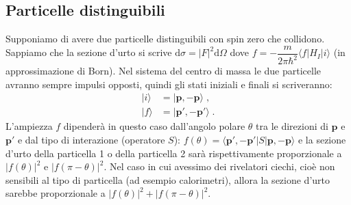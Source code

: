 \documentclass[10pt,a4paper]{report}
\theoremstyle{definition}
\numberwithin{equation}{section}
\newcommand{\diff}[1][]{\mathrm{d}#1}
\newcommand{\bra}{\langle}
\newcommand{\ket}{\rangle}
\begin{document}
\subsection{Particelle distinguibili}
Supponiamo di avere due particelle distinguibili con spin zero che collidono. Sappiamo che la sezione d'urto si scrive $\diff{\sigma}=|F|^2\diff{\Omega}$ dove $f=-\dfrac{m}{2\pi\hbar^2}\bra f|H_I|i\ket$ (in approssimazione di Born). Nel sistema del centro di massa le due particelle avranno sempre impulsi opposti, quindi gli stati iniziali e finali si scriveranno:
\begin{align*}
|i\ket&=|\mathbf{p},-\mathbf{p}\ket\;, \\
|f\ket&=|\mathbf{p}',-\mathbf{p}'\ket\;.
\end{align*}
L'ampiezza $f$ dipenderà in questo caso dall'angolo polare $\theta$ tra le direzioni di $\mathbf{p}$ e $\mathbf{p}'$ e dal tipo di interazione (operatore $S$): $f(\theta)=\bra \mathbf{p}',-\mathbf{p}'|S|\mathbf{p},-\mathbf{p}\ket$ e la sezione d'urto della particella 1 o della particella 2 sarà rispettivamente proporzionale a $|f(\theta)|^2$ e $|f(\pi-\theta)|^2$. Nel caso in cui avessimo dei rivelatori ciechi, cioè non sensibili al tipo di particella (ad esempio calorimetri), allora la sezione d'urto sarebbe proporzionale a $|f(\theta)|^2+|f(\pi-\theta)|^2$.
\end{document}
